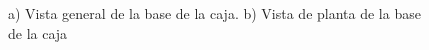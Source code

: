 \newpage

\begin{figure}[htpb]%
    \centering 
    \hspace{10pt}%
    \caption{a) Vista general de la base de la caja. b) Vista de planta de la base de la caja}
    \label{fig:cajabase} 
\end{figure} 


